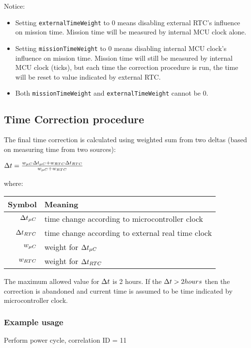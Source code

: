 Notice:
\begin{itemize}
    \item Setting \texttt{externalTimeWeight} to 0 means disabling external RTC's influence on mission time. Mission time will be measured by internal MCU clock alone.
    \item Setting \texttt{missionTimeWeight} to 0 means disabling internal MCU clock's influence on mission time. Mission time will still be measured by internal MCU clock (ticks), but each time the correction procedure is run, the time will be reset to value indicated by external RTC.
    \item Both \texttt{missionTimeWeight} and \texttt{externalTimeWeight} cannot be 0.
\end{itemize}

\subsection{Time Correction procedure}

The final time correction is calculated using weighted sum from two deltas (based on measuring time from two sources):

$\Delta t = \frac{w_{\mu C} \Delta t_{\mu C} + w_{RTC} \Delta t_{RTC}}{w_{\mu C} + w_{RTC}}$

where:

\begin{tabular}{r | l}
    Symbol & Meaning \\
    \hline
    $\Delta t_{\mu C}$ & time change according to microcontroller clock \\ 
    $\Delta t_{RTC}$ & time change according to external real time clock \\
    \label{sec:time-wMcu} $w_{\mu C}$ & weight for $\Delta t_{\mu C}$ \\
    \label{sec:time-wRtc} $w_{RTC}$ & weight for $\Delta t_{RTC}$ \\
\end{tabular}

The maximum allowed value for $\Delta t$ is 2 hours. If the $\Delta t > 2 hours$ then the correction is abandoned and current time is assumed to be time indicated by microcontroller clock.


\subsubsection{Example usage}
Perform power cycle, correlation ID = 11

